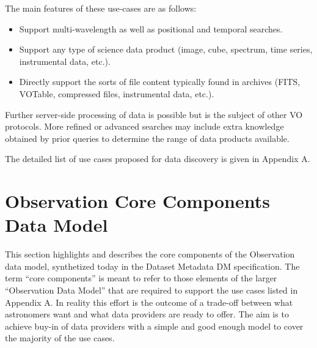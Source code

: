 \documentclass[11pt,a4paper]{ivoa}
\begin{document}
The main features of these use-cases are as follows:

\begin{itemize}
\item Support multi-wavelength as well as positional and temporal searches.
\item Support any type of science data product (image, cube, spectrum, time series, instrumental data, etc.).
\item Directly support the sorts of file content typically found in archives (FITS, VOTable, compressed files,
instrumental data, etc.).
\end{itemize}
Further server-side processing of data is possible but is the subject of other VO protocols.  More refined or advanced
searches may include extra knowledge obtained by prior queries to determine the range of data products available.

The detailed list of use cases proposed for data discovery is given in Appendix A.




\section[Observation Core Components Data Model]{Observation Core Components Data Model}
\label{sec:core-components}This section highlights and describes the core components of the Observation data model,
synthetized today in the Dataset Metadata DM specification. The term ``core components'' is meant to refer to those
elements of the larger ``Observation Data Model'' that are required to support the use cases listed in Appendix A.  In
reality this effort is the outcome of a trade-off between what astronomers want and what data providers are ready to
offer.  The aim is to achieve buy-in of data providers with a simple and {\textquotedbl}good enough{\textquotedbl}
model to cover the majority of the use cases.
\end{document}

